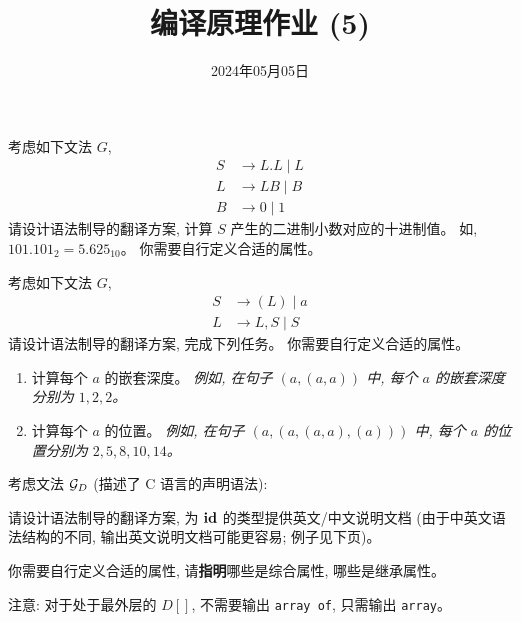 \documentclass[a4paper, justified]{tufte-handout}
\title{编译原理作业 (5)}
\date{2024年05月05日}
\begin{document}
\maketitle
\noplagiarism %
\begin{abstract}
\end{abstract}
\beginrequired

\begin{problem}
  考虑如下文法 $G$,
  \begin{align*}
    S &\to L.L \mid L \\
    L &\to LB \mid B \\
    B &\to 0 \mid 1
  \end{align*}
  请设计语法制导的翻译方案, 计算 $S$ 产生的二进制小数对应的十进制值。
  如, $101.101_{2} = 5.625_{10}$。
  你需要自行定义合适的属性。
\end{problem}

\begin{solution}
\end{solution}


\begin{problem}
  考虑如下文法 $G$,
  \begin{align*}
    S &\to (L) \mid a \\
    L &\to L, S \mid S
  \end{align*}
  请设计语法制导的翻译方案, 完成下列任务。
  你需要自行定义合适的属性。
  \begin{enumerate}[(1)]
    \item 计算每个 $a$ 的嵌套深度。
      {\it 例如, 在句子 $(a, (a, a))$ 中, 每个 $a$ 的嵌套深度分别为 $1, 2, 2$。}
    \item 计算每个 $a$ 的位置。
      {\it 例如, 在句子 $(a, (a, (a, a), (a)))$ 中, 每个 $a$ 的位置分别为
        $2, 5, 8, 10, 14$。}
  \end{enumerate}
\end{problem}

\begin{solution}
\end{solution}

\begin{problem}
  考虑文法 $\mathcal{G}_{D}$ (描述了 C 语言的声明语法):
  

  请设计语法制导的翻译方案, 为 $\text{\bf id}$ 的类型提供英文/中文说明文档
  (由于中英文语法结构的不同, 输出英文说明文档可能更容易; 例子见下页)。

  你需要自行定义合适的属性, 请{\bf 指明}哪些是综合属性, 哪些是继承属性。

  {注意: 对于处于最外层的 $D[]$, 不需要输出 \texttt{array of}, 只需输出 \texttt{array}。}
\end{problem}
\end{document}
